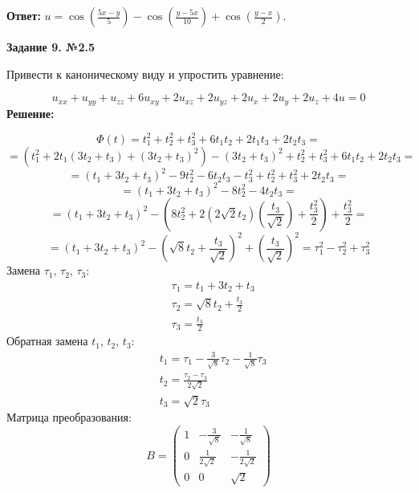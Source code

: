 \documentclass[a4paper,12pt]{article}
\begin{document}
\textbf{Ответ:} $u =\cos (\frac{5x-y}{5}) - \cos (\frac{y-5x}{10}) + \cos (\frac{y-x}{2})$.

\begin{center}    
    \textbf{Задание 9. №2.5}
\end{center}

Привести к каноническому виду и упростить уравнение:

\begin{equation*}
    u_{xx} + u_{yy} + u_{zz} + 6u_{xy} + 2u_{xz} + 2u_{yz} + 2u_{x} + 2u_{y} + 2u_{z} + 4u = 0
\end{equation*}
\textbf{Решение:}

\[
\Phi (t) = t_1^2 + t_2^2 + t_3^2 + 6t_1t_2 + 2t_1t_3 + 2t_2t_3 =
\]
\[
= (t_1^2 + 2t_1(3t_2 + t_3) + (3t_2 + t_3)^2) - (3t_2 + t_3)^2 + t_2^2+ t_3^2+ 6t_1t_2 + 2t_2t_3=
\]
\[
= (t_1 + 3t_2 + t_3)^2 - 9t_2^2 - 6t_2t_3 - t_3^2 + t_2^2 +t_3^2+ 2t_2t_3=
\]
\[
= (t_1 + 3t_2 + t_3)^2 - 8t_2^2 -4t_2t_3=
\]
\[
= (t_1 + 3t_2 + t_3)^2 - (8t_2^2 +2(2\sqrt{2}t_2)(\frac{t_3}{\sqrt{2}})+ \frac{t_3^2}{2})+\frac{t_3^2}{2}=
\]
\[
= (t_1 + 3t_2 + t_3)^2 - (\sqrt{8}t_2 + \frac{t_3}{\sqrt{2}})^2+(\frac{t_3}{\sqrt{2}})^2=\tau_1^2 - \tau_2^2 + \tau_3^2
\]
Замена $\tau_1, \,\tau_2, \,\tau_3$:
\begin{align*}
   &\tau_1 = t_1 + 3t_2 + t_3\\
   &\tau_2 = \sqrt{8}t_2 + \frac{t_3}{2} \\
   &\tau_3 =\frac{t_3}{2}
\end{align*}
Обратная замена $t_1, \,t_2, \,t_3$:
\begin{align*}
   &t_1 = \tau_1 - \frac{3}{\sqrt{8}}\tau_2 -\frac{1}{\sqrt{8}} \tau_3\\
   &t_2 = \frac{\tau_2-\tau_3}{2\sqrt{2}} \\
   &t_3 =\sqrt{2}\tau_3
\end{align*}
Матрица преобразования:
\[
B = 
\begin{pmatrix}
1 & -\frac{3}{\sqrt{8}} & -\frac{1}{\sqrt{8}} \\
0 & \frac{1}{2\sqrt{2}} & -\frac{1}{2\sqrt{2}} \\
0 & 0 & \sqrt{2}
\end{pmatrix}
\]
\end{document}

